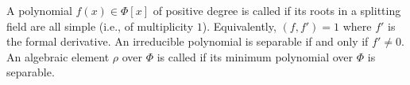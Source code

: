 A polynomial $f(x) \in \Phi[x]$ of positive degree is called  if its roots in a splitting field are all simple (i.e., of multiplicity $1$). Equivalently, $(f, f') = 1$ where $f'$ is the formal derivative. An irreducible polynomial is separable if and only if $f' \neq 0$. An algebraic element $\rho$ over $\Phi$ is called  if its minimum polynomial over $\Phi$ is separable.
